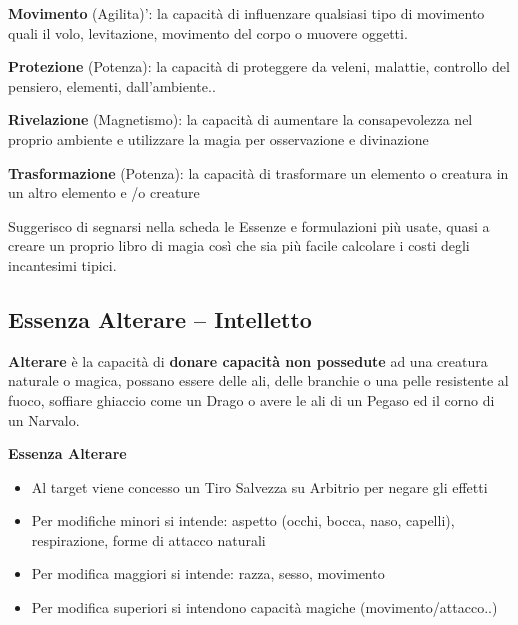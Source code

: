 \documentclass[a4paper,11pt,twoside,openany]{book}
\begin{document}
\textbf{Movimento} (Agilita)': la capacità di influenzare qualsiasi tipo di movimento quali il volo, levitazione, movimento del corpo o muovere oggetti.

\textbf{Protezione} (Potenza): la capacità di proteggere da veleni, malattie, controllo del pensiero, elementi, dall'ambiente..

\textbf{Rivelazione} (Magnetismo): la capacità di aumentare la consapevolezza nel proprio ambiente e utilizzare la magia per osservazione e divinazione

\textbf{Trasformazione} (Potenza): la capacità di trasformare un elemento o creatura in un altro elemento e /o creature

\bigskip

Suggerisco di segnarsi nella scheda le Essenze e formulazioni più usate, quasi a creare un proprio libro di magia così che sia più facile calcolare i costi degli incantesimi tipici.

\pagebreak

\subsection{Essenza Alterare -- Intelletto}

\label{essenza-alterare---intelletto}

\textbf{Alterare} è la capacità di \textbf{donare capacità non possedute} ad una creatura naturale o magica, possano essere delle ali, delle branchie o una pelle resistente al fuoco, soffiare ghiaccio come un Drago o avere le ali di un Pegaso ed il corno di un Narvalo.

\bigskip

\textbf{Essenza Alterare}
\begin{itemize}
\item 
Al target viene concesso un Tiro Salvezza su Arbitrio per negare gli effetti 
\item 
Per modifiche minori si intende: aspetto (occhi, bocca, naso, capelli), respirazione, forme di attacco naturali 
\item 
Per modifica maggiori si intende: razza, sesso, movimento 
\item 
Per modifica superiori si intendono capacità magiche (movimento/attacco..) 
\end{itemize}

\bigskip
\end{document}
